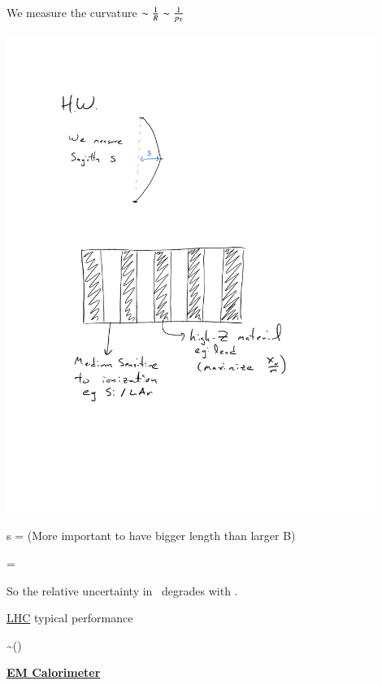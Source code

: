 {We measure the curvature $\sim \frac{1}{R} \sim \frac{1}{p_{\textrm{T}}}$

\begin{minipage}{0.3\textwidth}
\bc
\includegraphics[width=0.9\textwidth]{./sagittaNew.pdf}
\ec
\end{minipage}\hfill
\begin{minipage}{0.7\textwidth}
\be
s  = 
\ee
(More important to have bigger length than larger B)

\be
\Rightarrow \Delta {} = 
\ee

So the relative uncertainty in \pt\ degrades with \pt.
\end{minipage}

\underline{LHC} typical performance

\be
\frac{\Delta \pt}{\pt} \sim () 
\ee

\clearpage
\textbf{\underline{EM Calorimeter}}

}
